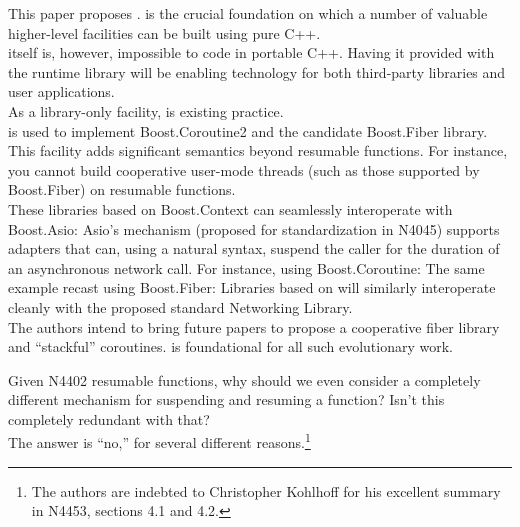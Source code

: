 This paper proposes .  is
the crucial foundation on which a number of valuable higher-level facilities
can be built using pure C++.\\
\newline
{} itself is, however, impossible to code in portable
C++. Having it provided with the runtime library will be enabling technology
for both third-party libraries and user applications.\\
\newline
As a library-only facility,
\cite{bcontext} is existing practice.\\
 is used to implement
Boost.Coroutine2\cite{bcoroutine2} and the candidate Boost.Fiber
library\cite{bfiber}.\\
\newline
This facility adds significant semantics beyond resumable functions. For
instance, you cannot build cooperative user-mode threads (such as those
supported by Boost.Fiber) on resumable functions.\\
\newline
These libraries based on Boost.Context can seamlessly interoperate with
Boost.Asio\cite{basio}: Asio's  mechanism (proposed for
standardization in N4045\cite{N4045}) supports adapters that can, using a
natural syntax, suspend the caller for the duration of an asynchronous network
call. For instance, using Boost.Coroutine:
The same example recast using Boost.Fiber:
Libraries based on  will similarly interoperate
cleanly with the proposed standard Networking Library\cite{P0112}.\\
\newline
The authors intend to bring future papers to propose a cooperative fiber
library and ``stackful'' coroutines.  is foundational
for all such evolutionary work.

Given N4402 resumable functions, why should we even consider a completely
different mechanism for suspending and resuming a function? Isn't this
completely redundant with that?\\
\newline
The answer is ``no,'' for several different reasons.\footnote{The authors are
indebted to Christopher Kohlhoff for his excellent summary in
N4453,\cite{N4453} sections 4.1 and 4.2.}

